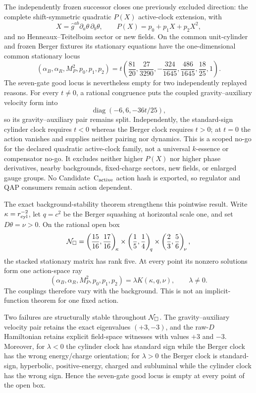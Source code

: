 \documentclass[11pt]{article}
\theoremstyle{definition}
\theoremstyle{remark}
\begin{document}
The independently frozen successor closes one previously excluded direction:
the complete shift-symmetric quadratic $P(X)$ active-clock extension, with
\[
 X=\widehat g^{ab}\partial_a\theta\,\partial_b\theta,
 \qquad P(X)=p_0+p_1X+p_2X^2,
\]
and no Henneaux--Teitelboim sector or new fields.  On the common unit-cylinder
and frozen Berger fixtures its stationary equations have the one-dimensional
common stationary locus
\[
 (\alpha_B,\alpha_R,M_P^2,p_0,p_1,p_2)
 =t\left(\frac{81}{20},\frac{27}{3290},-\frac{324}{1645},
          \frac{486}{1645},\frac{18}{25},1\right).
\]
The seven-gate good locus is nevertheless empty for two independently replayed
reasons.  For every $t\ne0$, a rational congruence puts the coupled
gravity--auxiliary velocity form into
\[
 \operatorname{diag}(-6,6,-36t/25),
\]
so its gravity--auxiliary pair remains split.  Independently, the standard-sign
cylinder clock requires $t<0$ whereas the Berger clock requires $t>0$; at
$t=0$ the action vanishes and supplies neither pairing nor dynamics.  This is
a scoped no-go for the declared quadratic active-clock family, not a universal
$k$-essence or compensator no-go.  It excludes neither higher $P(X)$ nor
higher phase derivatives, nearby backgrounds, fixed-charge sectors, new
fields, or enlarged gauge groups.  No Candidate~C$_{\rm active}$ action hash
is exported, so regulator and QAP consumers remain action dependent.

The exact background-stability theorem strengthens this pointwise result.
Write $\kappa=r_{\rm cyl}^{-2}$, let $q=c^2$ be the Berger squashing at
horizontal scale one, and set $D\theta=\nu>0$.  On the rational open box
\[
 {\cal N}_{\Box}=
 \left(\frac{15}{16},\frac{17}{16}\right)_{\!\kappa}
 \times\left(\frac15,\frac14\right)_{\!q}
 \times\left(\frac23,\frac56\right)_{\!\nu},
\]
the stacked stationary matrix has rank five.  At every point its nonzero
solutions form one action-space ray
\[
 (\alpha_B,\alpha_R,M_P^2,p_0,p_1,p_2)
 =\lambda K(\kappa,q,\nu),\qquad \lambda\ne0.
\]
The couplings therefore vary with the background.  This is not an
implicit-function theorem for one fixed action.

Two failures are structurally stable throughout ${\cal N}_{\Box}$.  The
gravity--auxiliary velocity pair retains the exact eigenvalues $(+3,-3)$,
and the raw-$D$ Hamiltonian retains explicit field-space witnesses with
values $+3$ and $-3$.  Moreover, for $\lambda<0$ the cylinder clock has
standard sign while the Berger clock has the wrong energy/charge
orientation; for $\lambda>0$ the Berger clock is standard-sign,
hyperbolic, positive-energy, charged and subluminal while the cylinder clock
has the wrong sign.  Hence the seven-gate good locus is empty at every point
of the open box.
\end{document}
